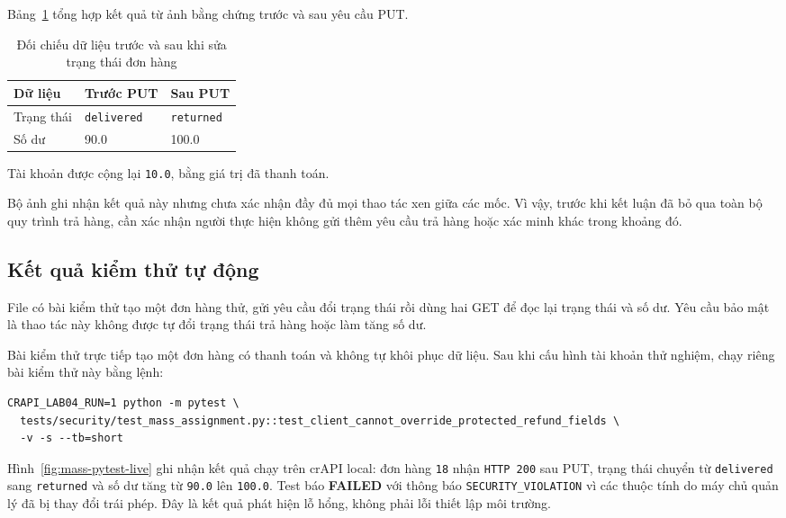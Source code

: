 \documentclass[oneside,a4paper,12pt]{extreport}
\begin{document}
Bảng~\ref{tab:mass-assignment-result} tổng hợp kết quả từ ảnh bằng chứng
trước và sau yêu cầu PUT.

\begin{table}[htbp]
    \centering
    \caption{Đối chiếu dữ liệu trước và sau khi sửa trạng thái đơn hàng}
    \label{tab:mass-assignment-result}
    \begin{tabularx}{\textwidth}{@{} X l l @{}}
        \toprule
        \textbf{Dữ liệu} & \textbf{Trước PUT} & \textbf{Sau PUT} \\
        \midrule
        Trạng thái & \texttt{delivered} & \texttt{returned} \\
        Số dư & 90.0 & 100.0 \\
        \bottomrule
    \end{tabularx}
\end{table}

Tài khoản được cộng lại \texttt{10.0}, bằng giá trị đã thanh toán.

Bộ ảnh ghi nhận kết quả này nhưng chưa xác nhận đầy đủ mọi thao tác
xen giữa các mốc. Vì vậy, trước khi kết luận đã bỏ qua toàn bộ quy trình
trả hàng, cần xác nhận người thực hiện không gửi thêm yêu cầu trả hàng
hoặc xác minh khác trong khoảng đó.

\clearpage
\subsection{Kết quả kiểm thử tự động}

File  có bài kiểm thử tạo
một đơn hàng thử, gửi yêu cầu đổi trạng thái rồi dùng hai GET để đọc lại
trạng thái và số dư. Yêu cầu bảo mật là thao tác này không được tự đổi
trạng thái trả hàng hoặc làm tăng số dư.

Bài kiểm thử trực tiếp tạo một đơn hàng có thanh toán và không tự
khôi phục dữ liệu. Sau khi cấu hình tài khoản thử nghiệm, chạy riêng
bài kiểm thử này bằng lệnh:

\begin{Verbatim}[breaklines=true,breakanywhere=true,fontsize=\small]
CRAPI_LAB04_RUN=1 python -m pytest \
  tests/security/test_mass_assignment.py::test_client_cannot_override_protected_refund_fields \
  -v -s --tb=short
\end{Verbatim}

Hình~\ref{fig:mass-pytest-live} ghi nhận kết quả chạy trên crAPI local:
đơn hàng \texttt{18} nhận \texttt{HTTP 200} sau PUT, trạng thái chuyển
từ \texttt{delivered} sang \texttt{returned} và số dư tăng từ
\texttt{90.0} lên \texttt{100.0}. Test báo \textbf{FAILED} với thông
báo \texttt{SECURITY\_VIOLATION} vì các thuộc tính do máy chủ quản lý
đã bị thay đổi trái phép. Đây là kết quả phát hiện lỗ hổng, không phải
lỗi thiết lập môi trường.
\end{document}
